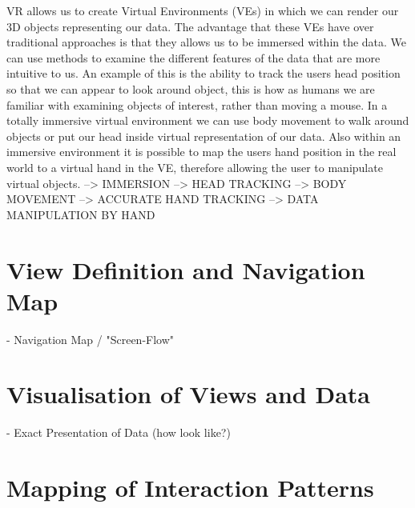 VR allows us to create Virtual Environments (VEs) in which we can render our 3D objects representing our data. The advantage that these VEs have over traditional approaches is that they allows us to be immersed within the data. We can use methods to examine the different features of the data that are more intuitive to us. An example of this is the ability to track the users head position so that we can appear to look around object, this is how as humans we are familiar with examining objects of interest, rather than moving a mouse. In a totally immersive virtual environment we can use body movement to walk around objects or put our head inside virtual representation of our data. Also within an immersive environment it is possible to map the users hand position in the real world to a virtual hand in the VE, therefore allowing the user to manipulate virtual objects.
\cite{Jamieson2007}
--> IMMERSION
--> HEAD TRACKING
--> BODY MOVEMENT
--> ACCURATE HAND TRACKING
--> DATA MANIPULATION BY HAND





\section{View Definition and Navigation Map}


- Navigation Map / "Screen-Flow"



\section{Visualisation of Views and Data}

- Exact Presentation of Data (how look like?)



\section{Mapping of Interaction Patterns}

